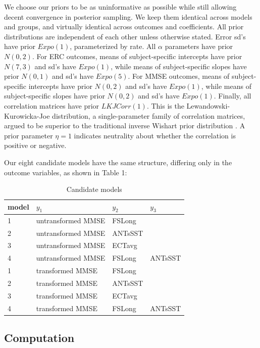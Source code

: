 \documentclass[12pt]{article}
\begin{document}
We choose our priors to be as uninformative as possible while still allowing decent convergence in posterior sampling. We keep them identical across models and groups, and virtually identical across outcomes and coefficients. All prior distributions are independent of each other unless otherwise stated. Error sd's have prior $Expo(1)$, parameterized by rate. All $\alpha$ parameters have prior $N(0,2)$. For ERC outcomes, means of subject-specific intercepts have prior $N(7,3)$ and sd's have $Expo(1)$, while means of subject-specific slopes have prior $N(0,1)$ and sd's have $Expo(5)$. For MMSE outcomes, means of subject-specific intercepts have prior $N(0,2)$ and sd's have $Expo(1)$, while means of subject-specific slopes have prior $N(0,2)$ and sd's have $Expo(1)$. Finally, all correlation matrices have prior $LKJCorr(1)$. This is the Lewandowski-Kurowicka-Joe distribution, a single-parameter family of correlation matrices, argued to be superior to the traditional inverse Wishart prior distribution \citep{gelman1995bayesian}. A prior parameter $\eta=1$ indicates neutrality about whether the correlation is positive or negative. 

Our eight candidate models have the same structure, differing only in the  outcome variables, as shown in Table 1:

\begin{table}[H]
\centering
\caption{Candidate models}
\begin{tabular}{|l|l|l|l|}
\toprule
model & $y_1$ & $y_2$ & $y_3$\\
\midrule
1 & untransformed MMSE & FSLong & \\
2 & untransformed MMSE & ANTsSST & \\
3 & untransformed MMSE & ECTavg & \\
4 & untransformed MMSE & FSLong & ANTsSST \\
1 & transformed MMSE & FSLong & \\
2 & transformed MMSE & ANTsSST & \\
3 & transformed MMSE & ECTavg & \\
4 & transformed MMSE & FSLong & ANTsSST \\
\bottomrule
\end{tabular}
\end{table}

\pagebreak
\subsection{Computation}
\end{document}
